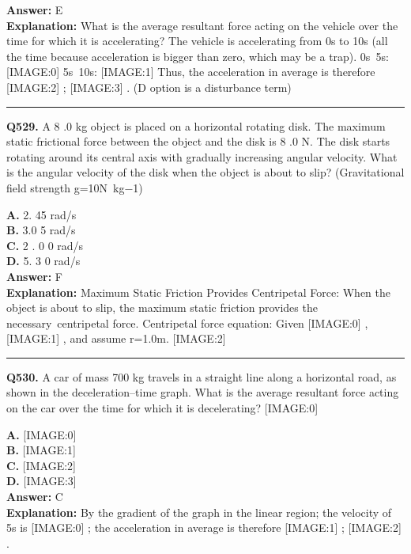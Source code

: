 \documentclass[12pt]{article}
\begin{document}
\textbf{Answer:} E \\
\textbf{Explanation:} What is the average resultant force acting on the vehicle over the time for which it is accelerating?
The vehicle is accelerating from 0s to 10s (all the time because acceleration is bigger than zero, which may be a trap).
0s~5s:
[IMAGE:0]
5s~10s:
[IMAGE:1]
Thus, the acceleration in average is therefore
[IMAGE:2]
;
[IMAGE:3]
. (D option is a disturbance term)

\hrule
\vspace{1em}


\noindent
\textbf{Q529.} A
8
.0 kg object is placed on a horizontal rotating disk. The maximum static frictional force between the object and the disk is
8
.0 N. The disk starts rotating around its central axis with gradually increasing angular velocity. What is the angular velocity of the disk when the object is about to slip? (Gravitational field strength g=10N kg−1)



\textbf{A.} 2.
45
rad/s \\
\textbf{B.} 3.0
5
rad/s \\
\textbf{C.} 2
.
0
0 rad/s \\
\textbf{D.} 5.
3
0 rad/s \\

\textbf{Answer:} F \\
\textbf{Explanation:} Maximum Static Friction Provides Centripetal Force:
When the object is about to slip, the maximum static friction provides the necessary centripetal force. Centripetal force equation:
Given
[IMAGE:0]
,
[IMAGE:1]
, and assume r=1.0m.
[IMAGE:2]

\hrule
\vspace{1em}


\noindent
\textbf{Q530.} A car of mass 700 kg travels in a straight line along a horizontal road, as shown in the deceleration–time graph.
What is the average resultant force acting on the car over the time for which it is decelerating?
[IMAGE:0]



\textbf{A.} [IMAGE:0] \\
\textbf{B.} [IMAGE:1] \\
\textbf{C.} [IMAGE:2] \\
\textbf{D.} [IMAGE:3] \\

\textbf{Answer:} C \\
\textbf{Explanation:} By the gradient of the graph in the linear region; the velocity of 5s is
[IMAGE:0]
; the acceleration in average is therefore
[IMAGE:1]
;
[IMAGE:2]
.
\end{document}
